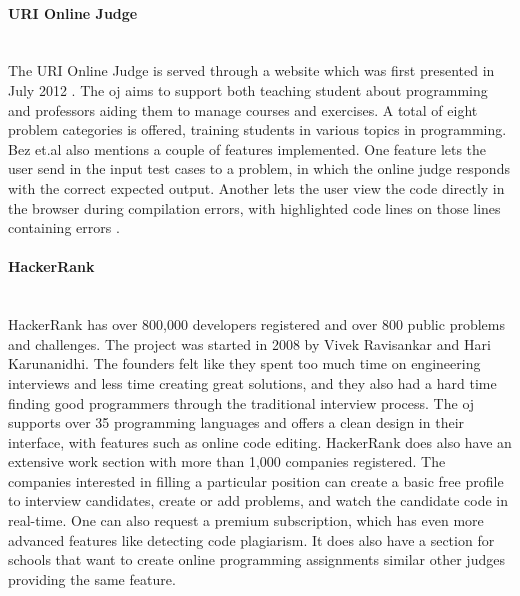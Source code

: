 \paragraph*{URI Online Judge} \hfill \\
The URI Online Judge is served through a website which was first presented in July 2012 \cite{a:Bez2013}. The \gls{oj} aims to support both teaching student about programming and professors aiding them to manage courses and exercises. A total of eight problem categories is offered, training students in various topics in programming. Bez et.al also mentions a couple of features implemented. One feature lets the user send in the input test cases to a problem, in which the online judge responds with the correct expected output. Another lets the user view the code directly in the browser during compilation errors, with highlighted code lines on those lines containing errors \cite{a:Bez2013}.
\clearpage
\paragraph*{HackerRank} \hfill \\
HackerRank \cite{HACKERRANK} has over 800,000 developers registered and over 800 public problems and challenges. The project was started in 2008 by Vivek Ravisankar and Hari Karunanidhi. The founders felt like they spent too much time on engineering interviews and less time creating great solutions, and they also had a hard time finding good programmers through the traditional interview process. The \gls{oj} supports over 35 programming languages and offers a clean design in their interface, with features such as online code editing. HackerRank does also have an extensive work section with more than 1,000 companies registered. The companies interested in filling a particular position can create a basic free profile to interview candidates, create or add problems, and watch the candidate code in real-time. One can also request a premium subscription, which has even more advanced features like detecting code plagiarism. It does also have a section for schools that want to create online programming assignments similar other judges providing the same feature.

